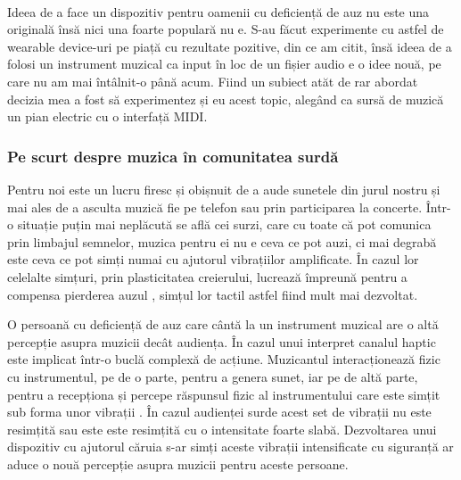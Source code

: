 \documentclass[../IoMusT.tex]{subfiles}
\begin{document}
\\
 \par Ideea de a face un dispozitiv pentru oamenii cu deficiență de auz nu este una originală însă nici una foarte populară nu e. S-au făcut experimente cu astfel de wearable device-uri pe piață cu rezultate pozitive, din ce am citit, însă ideea de a folosi un instrument muzical ca input în loc de un fișier audio e o idee nouă, pe care nu am mai întâlnit-o până acum. Fiind un subiect atăt de rar abordat decizia mea a fost să experimentez și eu acest topic, alegând ca sursă de muzică un pian electric cu o interfață MIDI.

\subsubsection{Pe scurt despre muzica în comunitatea surdă}
Pentru noi este un lucru firesc și obișnuit de a aude sunetele din jurul nostru și mai ales de a asculta muzică fie pe telefon sau prin participarea la concerte. Într-o situație puțin mai neplăcută se află cei surzi, care cu toate că pot comunica prin limbajul semnelor, muzica pentru ei nu e ceva ce pot auzi, ci mai degrabă este ceva ce pot simți numai cu ajutorul vibrațiilor amplificate. În cazul lor celelalte simțuri, prin plasticitatea creierului, lucrează împreună pentru a compensa pierderea auzul \cite{DEAF}, simțul lor tactil astfel fiind mult mai dezvoltat. 
\\
\par O persoană cu deficiență de auz care cântă la un instrument muzical are o altă percepție asupra muzicii decât audiența. În cazul unui interpret canalul haptic este implicat într-o buclă complexă de acțiune. Muzicantul interacționează fizic cu instrumentul, pe de o parte, pentru a genera sunet, iar pe de altă parte, pentru a recepționa și percepe răspunsul fizic al instrumentului care este simțit sub forma unor vibrații \cite{Haptic}. În cazul audienței surde acest set de vibrații nu este resimțită sau este este resimțită cu o intensitate foarte slabă. Dezvoltarea unui dispozitiv cu ajutorul căruia s-ar simți aceste vibrații intensificate cu siguranță ar aduce o nouă percepție asupra muzicii pentru aceste persoane.
\end{document}
